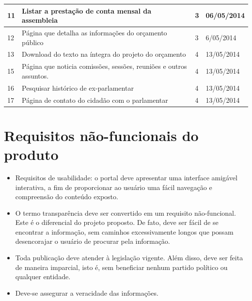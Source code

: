 \documentclass[12pt, a4paper]{article}
\begin{document}
\begin{longtabu}{X[-1, r] | X | X[-1, r] | X[-1]}
            11 &
            Listar a prestação de conta mensal da assembleia &
            3 & 06/05/2014
            \\ \hline

            12 &
            Página que detalha as informações do orçamento público &
            3 & 6/05/2014
            \\ \hline

            13 &
            Download do texto na íntegra do projeto do orçamento &
            4 & 13/05/2014
            \\ \hline

            15 &
            Página que noticia comissões, sessões, reuniões e outros assuntos.
            &
            4 & 13/05/2014
            \\ \hline

            16 &
            Pesquisar histórico de ex-parlamentar &
            4 & 13/05/2014
            \\ \hline

            17 &
            Página de contato do cidadão com o parlamentar &
            4 & 13/05/2014
            \\ \hline
        \end{longtabu}

    \section{Requisitos não-funcionais do produto}
    \begin{itemize}
        \item
        Requisitos de usabilidade: o portal deve apresentar uma interface
        amigável interativa, a fim de proporcionar ao usuário uma fácil
        navegação e compreensão do conteúdo exposto.
        \item
        O termo transparência deve ser convertido em um requisito
        não-funcional. Este é o diferencial do projeto proposto. De fato, deve
        ser fácil de se encontrar a informação, sem caminhos excessivamente
        longos que possam desencorajar o usuário de procurar pela informação.
        \item
        Toda publicação deve atender à legislação vigente. Além disso, deve ser
        feita de maneira imparcial, isto é, sem beneficiar nenhum partido
        político ou qualquer entidade.
        \item
        Deve-se assegurar a veracidade das informações.
    \end{itemize}
\end{document}
